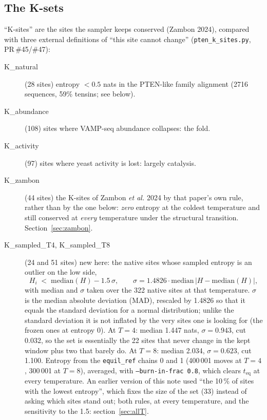 \documentclass[11pt,a4paper]{article}
\newcommand{\file}[1]{\texttt{#1}}
\begin{document}
\subsection{The K-sets}

``K-sites'' are the sites the sampler keeps conserved (Zambon 2024), compared
with three external definitions of ``this site cannot change''
(\file{pten\_k\_sites.py}, PR\,\#45/\#47):
\begin{description}
\item[K\_natural] (28 sites) entropy $<0.5$ nats in the PTEN-like family
  alignment (2716 sequences, 59\% tensins; see below).
\item[K\_abundance] (108) sites where VAMP-seq abundance collapses: the fold.
\item[K\_activity] (97) sites where yeast activity is lost: largely catalysis.
\item[K\_zambon] (44 sites) the K-sites of Zambon \emph{et al.} 2024 by
  that paper's own rule, rather than by the one below:
  \emph{zero} entropy at the coldest temperature and still conserved at
  \emph{every} temperature under the structural transition. Section~\ref{sec:zambon}.
\item[K\_sampled\_T4, K\_sampled\_T8] (24 and 51 sites) new here: the
  native sites whose sampled entropy is an outlier on the low side,
  \[
    H_i \;<\; \mathrm{median}(H) - 1.5\,\sigma, \qquad
    \sigma = 1.4826\cdot\mathrm{median}\,|H - \mathrm{median}(H)| ,
  \]
  with median and $\sigma$ taken over the 322 native sites at that
  temperature. $\sigma$ is the median absolute deviation (MAD), rescaled by
  1.4826 so that it equals the standard deviation for a normal distribution;
  unlike the standard deviation it is not inflated by the very sites one is
  looking for (the frozen ones at entropy 0). At $T=4$: median 1.447 nats,
  $\sigma=0.943$, cut 0.032, so the set is essentially the 22 sites that never
  change in the kept window plus two that barely do. At $T=8$: median 2.034,
  $\sigma=0.623$, cut 1.100. Entropy from the \file{equil\_ref} chains 0 and 1
  (400\,001 moves at $T=4$, 300\,001 at $T=8$), averaged, with
  \texttt{--burn-in-frac 0.8}, which clears $t_{\mathrm{eq}}$ at every
  temperature. An earlier version of this note used ``the 10\,\% of sites with
  the lowest entropy'', which fixes the size of the set (33) instead of asking
  which sites stand out; both rules, at every temperature, and the sensitivity
  to the 1.5: section~\ref{sec:allT}.
\end{description}
\end{document}
